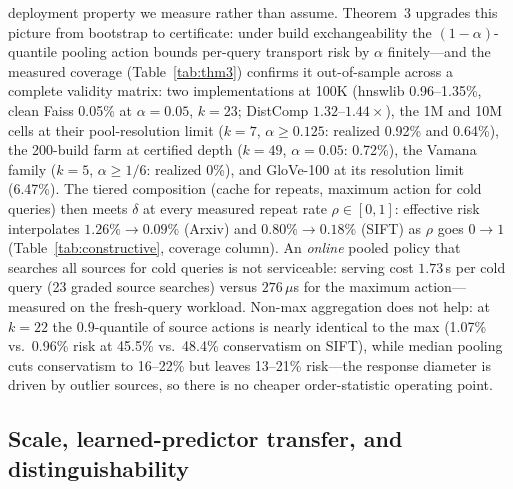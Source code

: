 \documentclass{article}
\begin{document}
deployment property we measure rather than assume. Theorem~3 upgrades this picture from bootstrap to
certificate: under build exchangeability the $(1{-}\alpha)$-quantile pooling action bounds per-query
transport risk by $\alpha$ finitely---and the measured coverage (Table~\ref{tab:thm3}) confirms it
out-of-sample across a complete validity matrix: two implementations at 100K (hnswlib 0.96--1.35\%,
clean Faiss 0.05\% at $\alpha{=}0.05$, $k{=}23$; DistComp $1.32$--$1.44\times$), the 1M and 10M cells
at their pool-resolution limit ($k{=}7$, $\alpha{\ge}0.125$: realized 0.92\% and 0.64\%), the
200-build farm at certified depth ($k{=}49$, $\alpha{=}0.05$: 0.72\%), the Vamana family
($k{=}5$, $\alpha{\ge}1/6$: realized 0\%), and GloVe-100 at its resolution limit (6.47\%). The tiered composition (cache for repeats, maximum action for cold
queries) then meets $\delta$ at every measured repeat rate $\rho\in[0,1]$: effective risk interpolates
$1.26\%\to0.09\%$ (Arxiv) and $0.80\%\to0.18\%$ (SIFT) as $\rho$ goes $0\to1$ (Table~\ref{tab:constructive},
coverage column). An \emph{online} pooled policy that searches all sources for cold queries is not
serviceable: serving cost $1.73$\,s per cold query (23 graded source searches) versus $276\,\mu$s for the
maximum action---measured on the fresh-query workload. Non-max aggregation does not help: at $k{=}22$ the $0.9$-quantile of source
actions is nearly identical to the max (1.07\% vs.\ 0.96\% risk at 45.5\% vs.\ 48.4\% conservatism on
SIFT), while median pooling cuts conservatism to 16--22\% but leaves 13--21\% risk---the response
diameter is driven by outlier sources, so there is no cheaper order-statistic operating point.

\subsection{Scale, learned-predictor transfer, and distinguishability}
\label{sec:scale}
\end{document}
